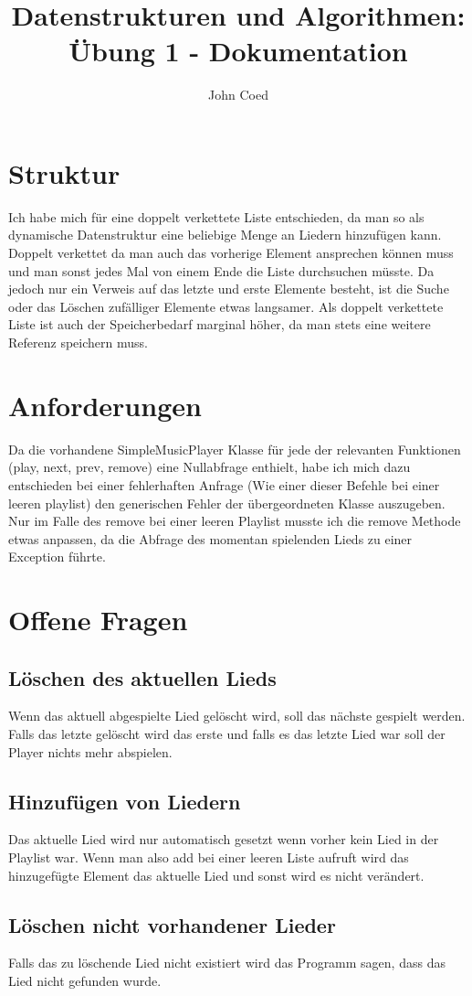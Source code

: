 \documentclass{article}
\title{\vspace{-1cm}Datenstrukturen und Algorithmen: Übung 1 - Dokumentation}
\author{John Coed}
\begin{document}
	\maketitle
	\section*{Struktur}
	Ich habe mich für eine doppelt verkettete Liste entschieden, da man so als dynamische Datenstruktur eine beliebige Menge an Liedern hinzufügen kann. Doppelt verkettet da man auch das vorherige Element ansprechen können muss und man sonst jedes Mal von einem Ende die Liste durchsuchen müsste. Da jedoch nur ein Verweis auf das letzte und erste Elemente besteht, ist die Suche oder das Löschen zufälliger Elemente etwas langsamer. Als doppelt verkettete Liste ist auch der Speicherbedarf marginal höher, da man stets eine weitere Referenz speichern muss.
	\section*{Anforderungen}
	Da die vorhandene SimpleMusicPlayer Klasse für jede der relevanten Funktionen (play, next, prev, remove) eine Nullabfrage enthielt, habe ich mich dazu entschieden bei einer fehlerhaften Anfrage (Wie einer dieser Befehle bei einer leeren playlist) den generischen Fehler der übergeordneten Klasse auszugeben. Nur im Falle des remove bei einer leeren Playlist musste ich die remove Methode etwas anpassen, da die Abfrage des momentan spielenden Lieds zu einer Exception führte.
	\section*{Offene Fragen}
	\subsection*{Löschen des aktuellen Lieds}
	Wenn das aktuell abgespielte Lied gelöscht wird, soll das nächste gespielt werden. Falls das letzte gelöscht wird das erste und falls es das letzte Lied war soll der Player nichts mehr abspielen.
	\subsection*{Hinzufügen von Liedern}
	Das aktuelle Lied wird nur automatisch gesetzt wenn vorher kein Lied in der Playlist war. Wenn man also add bei einer leeren Liste aufruft wird das hinzugefügte Element das aktuelle Lied und sonst wird es nicht verändert.
	\subsection*{Löschen nicht vorhandener Lieder}
	Falls das zu löschende Lied nicht existiert wird das Programm sagen, dass das Lied nicht gefunden wurde.
\end{document}
